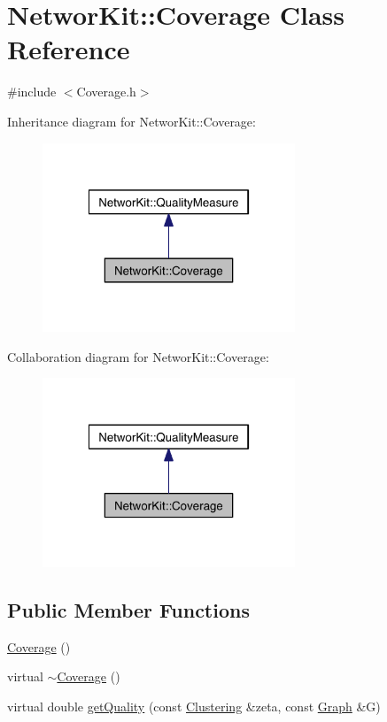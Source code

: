\hypertarget{class_networ_kit_1_1_coverage}{\section{Networ\-Kit\-:\-:Coverage Class Reference}
\label{class_networ_kit_1_1_coverage}
}


{\ttfamily \#include $<$Coverage.\-h$>$}



Inheritance diagram for Networ\-Kit\-:\-:Coverage\-:\nopagebreak
\begin{figure}[H]
\begin{center}
\leavevmode
\includegraphics[width=214pt]{class_networ_kit_1_1_coverage__inherit__graph}
\end{center}
\end{figure}


Collaboration diagram for Networ\-Kit\-:\-:Coverage\-:\nopagebreak
\begin{figure}[H]
\begin{center}
\leavevmode
\includegraphics[width=214pt]{class_networ_kit_1_1_coverage__coll__graph}
\end{center}
\end{figure}
\subsection*{Public Member Functions}
\begin{DoxyCompactItemize}
\item 
\hyperlink{class_networ_kit_1_1_coverage_a768d5cd8b011f50300c1f6e667b465bc}{Coverage} ()
\item 
virtual \hyperlink{class_networ_kit_1_1_coverage_a1457a5ca9ac430e056a899fe1ff45484}{$\sim$\-Coverage} ()
\item 
virtual double \hyperlink{class_networ_kit_1_1_coverage_a968df2cf4f8202170637e17b5f2988cd}{get\-Quality} (const \hyperlink{class_networ_kit_1_1_clustering}{Clustering} \&zeta, const \hyperlink{class_networ_kit_1_1_graph}{Graph} \&G)
\end{DoxyCompactItemize}


